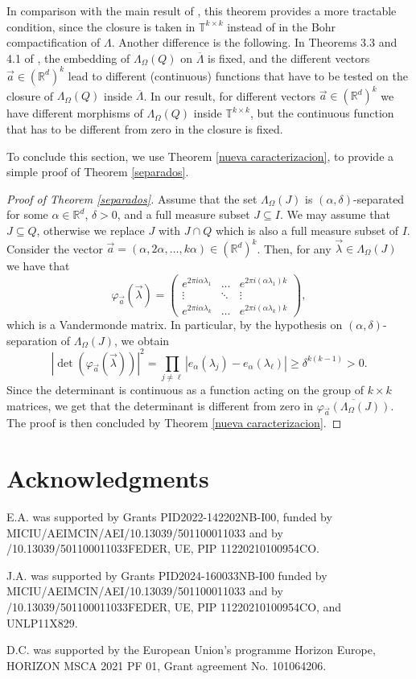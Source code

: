\documentclass[a4paper,11pt]{amsart}
\theoremstyle{definition}
\theoremstyle{definition}
\def\bdem{\begin{proof}}
\def\edem{\end{proof}}
\def\fii{\varphi }
\def\la{\lambda}
\def\La{\Lambda}
\def\W{\Omega}
\def\R{\mathbb{R}}
\def\T{\mathbb{T}}
\begin{document}
In comparison with the main result of \cite{CUC}, this theorem provides a more tractable condition, since the closure is taken in $\T^{k\times k}$ instead of in the Bohr compactification of $\La$.  Another difference is the following. In Theorems 3.3  and 4.1 of \cite{CUC}, the embedding of $\La_\W(Q)$ on $\overline{\La}$ is fixed, and the different vectors $\vec{a}\in (\R^d)^k$ lead to different (continuous) functions that have to be tested on the closure of $\La_\W(Q)$ inside $\overline{\La}$. In our result, for different vectors $\vec{a}\in (\R^d)^k$ we have different morphisms of 
$\La_\W(Q)$ inside $\T^{k\times k}$, but the continuous function that has to be different from zero in the closure is fixed. 

To conclude this section, we use Theorem \ref{nueva caracterizacion}, to provide a simple proof of Theorem \ref{separados}.

\bdem[Proof of Theorem \ref{separados}]
Assume that the set $\La_\W(J)$ is $(\alpha,\delta)$-separated for some $\alpha \in\R^d$, $\delta>0$, and a full measure subset $J\subseteq I$. We may assume that $J\subseteq Q$, otherwise we replace $J$ with $J\cap Q$ which is also a full measure subset of $I$. Consider the vector $\vec{a}=(\alpha,2\alpha,\ldots,k \alpha)\in (\R^d)^k$. Then, for any $\vec{\la}\in \La_\W(J)$ we have that
$$
\fii_{\vec{a}}(\vec{\la})=
\begin{pmatrix}
	e^{2\pi i \alpha \la_1} &\ldots& e^{2\pi i (\alpha  \la_1) k }  \\
	\vdots&\ddots&\vdots\\
	e^{2\pi i \alpha  \la_k}&\ldots& e^{2\pi i (\alpha\la_k) k }
\end{pmatrix},	
$$
which is a Vandermonde matrix. In particular, by the hypothesis on  $(\alpha,\delta)$-separation of $\La_\W(J)$, we obtain
$$
\left|\det(\fii_{\vec{a}}(\vec{\la}))\right|^2=\prod_{j\neq \ell} \left|e_\alpha(\la_j)-e_\alpha(\la_\ell)\right|\geq \delta^{k(k-1)}>0.
$$
Since the determinant is continuous as a function acting on the group of $k\times k$ matrices, we get that the determinant is different from zero in $\overline{\fii_{\vec{a}}(\La_\W(J))}$. 
The proof is then concluded by Theorem \ref{nueva caracterizacion}.
\edem

\section*{Acknowledgments}

\noindent E.A.  was supported by Grants PID2022-142202NB-I00, funded by \\ MICIU/AEIMCIN/AEI/10.13039/501100011033 and by\\ /10.13039/501100011033FEDER, UE,  PIP 11220210100954CO.

\noindent J.A. was supported by Grants PID2024-160033NB-I00 funded by \\ MICIU/AEIMCIN/AEI/10.13039/501100011033 and by\\ /10.13039/501100011033FEDER, UE,  PIP 11220210100954CO, and UNLP11X829. 

\noindent D.C. was supported by the European Union’s programme Horizon Europe, HORIZON MSCA 2021 PF 01, Grant agreement No. 101064206.


\printbibliography
\end{document}
